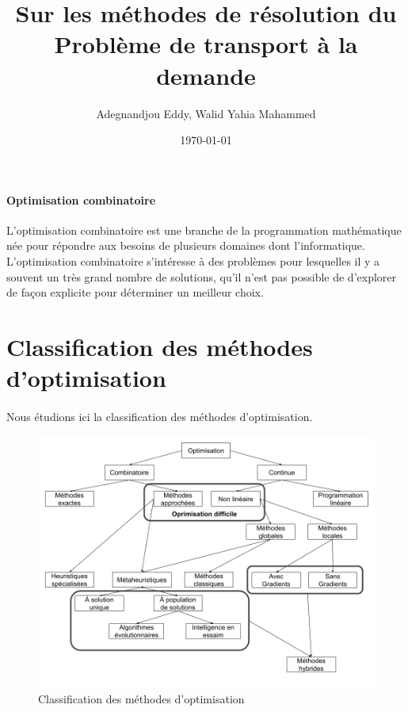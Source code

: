 \documentclass{article}
\begin{document}
\title{Sur les méthodes de résolution du Problème de transport à la demande}
\author{Adegnandjou Eddy, Walid Yahia Mahammed}
\date{\today}
\maketitle

\newpage

\paragraph{Optimisation combinatoire}
L'optimisation combinatoire est une branche de la programmation mathématique née pour répondre aux besoins de plusieurs domaines dont l'informatique. L'optimisation combinatoire s'intéresse à des problèmes pour lesquelles il y a souvent un très grand nombre de solutions, qu'il n'est pas possible de d'explorer de façon explicite pour déterminer un meilleur choix.

\section{Classification des méthodes d'optimisation}
\paragraph{}
Nous étudions ici la classification des méthodes d'optimisation.
\begin{figure}[h]
\includegraphics[scale=0.4]{images/classification-des-methodes-doptimisation.png}
\caption{Classification des méthodes d'optimisation \cite{12-dreo}}
\end{figure}
\end{document}
